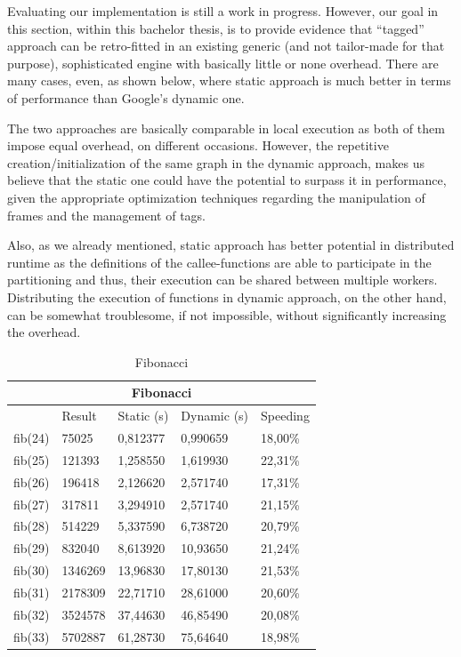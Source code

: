 \documentclass[ack,preface]{dithesis}
\begin{document}
Evaluating our implementation is still a work in progress. However, our goal in this section, within this bachelor thesis, is to provide evidence that “tagged” approach can be retro-fitted in an existing generic (and not tailor-made for that purpose), sophisticated engine with basically  little or  none overhead. There are  many cases, even, as shown below, where static approach is much better in terms of performance than  Google's dynamic one.

The two approaches are basically comparable in local execution as both of them impose equal overhead, on different occasions.
However, the repetitive creation/initialization of the same graph in the dynamic approach, makes us believe that the static one could have the potential to surpass it in performance, given the appropriate optimization techniques regarding the manipulation of frames and the management of tags. 

Also, as we already mentioned, static approach has better potential in distributed runtime as the definitions of the callee-functions are able to participate in the partitioning and thus, their execution can be shared between multiple workers. Distributing the execution of functions in dynamic approach, on the other hand, can be somewhat troublesome, if not impossible, without significantly increasing the overhead.


\begin{table}[h!]
\centering

\begin{tabular}{ |p{3cm}||p{2cm}|p{3cm}|p{3cm}||p{2cm}|  }

 \hline
 \multicolumn{5}{|c|}{\textbf{\footnotesize Fibonacci}} \\
 \hline
 	& Result &Static (s)&Dynamic (s)&Speeding\\
 \hline
 fib(24) & 75025      &0,812377    &   0,990659 &   18,00\%\\
 fib(25) & 121393    &1,258550    &1,619930    &   22,31\%\\
 fib(26) & 196418    & 2,126620   &  2,571740  &   17,31\%\\
 fib(27) & 317811    & 3,294910   &  2,571740  &   21,15\%\\
 fib(28) & 514229    & 5,337590   &6,738720    &   20,79\%\\
 fib(29) & 832040    & 8,613920   &10,93650   &   21,24\%\\
 fib(30) & 1346269  & 13,96830 &17,80130  &   21,53\%\\
 fib(31) & 2178309  & 22,71710 &28,61000  &   20,60\%\\
 fib(32) & 3524578  & 37,44630 &46,85490  &   20,08\%\\
 fib(33) & 5702887  & 61,28730 &75,64640  &   18,98\%\\
 \hline
\end{tabular}
\caption{Fibonacci}
\label{table:1}
\end{table}
\end{document}

